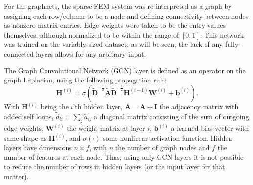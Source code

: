 \documentclass{siamart190516}
\newcommand{\mat}[1]{\bm{{#1}}}
\renewcommand{\vec}[1]{\bm{{#1}}}
\begin{document}
For the graphnets, the sparse FEM system was re-interpreted as a graph by assigning each row/column to be a node and defining connectivity between nodes as nonzero matrix entries.  Edge weights were taken to be the entry values themselves, although normalized to be within the range of $[0, 1]$.   This network was trained on the variably-sized dataset; as will be seen, the lack of any fully-connected layers allows for any arbitrary input.

The Graph Convolutional Network (GCN) layer is defined as an operator on the graph Laplacian, using the following propagation rule:
%
\begin{equation}
  \mat{H}^{\left(i\right)} = \sigma\left( \mat{\tilde{D}}^{-\frac{1}{2}} \mat{\tilde{A}} \mat{\tilde{D}}^{-\frac{1}{2}} \mat{H}^{\left(i-1\right)} \mat{W}^{\left(i\right)} + \vec{b}^{(i)} \right).
\end{equation}
%
With $\mat{H}^{\left(i\right)}$ being the $i$'th hidden layer, $\mat{\tilde{A}} = \mat{A} + \mat{I}$ the adjacency matrix with added self loops, $\tilde{d}_{ii}=\sum_j\tilde{a}_{ij}$ a diagonal matrix consisting of the sum of outgoing edge weights, $\mat{W}^{(i)}$ the weight matrix at layer $i$, $\vec{b}^{(i)}$ a learned bias vector with same shape as $\mat{H}^{(i)}$, and $\sigma\left(\cdot\right)$ some nonlinear activation function.  Hidden layers have dimensions $n \times f$, with $n$ the number of graph nodes and $f$ the number of features at each node.  Thus, using only GCN layers it is not possible to reduce the number of rows in hidden layers (or the input layer for that matter).
\end{document}
